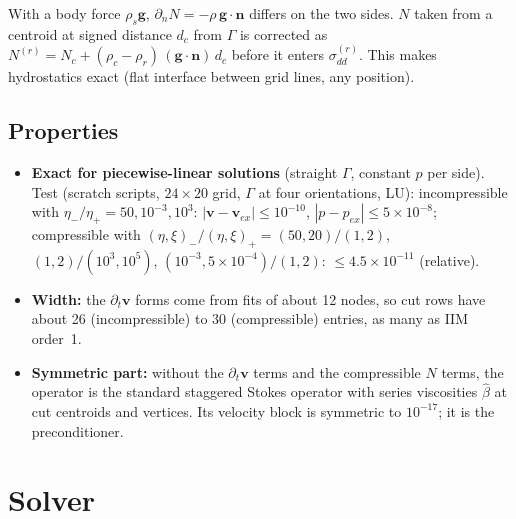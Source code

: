 \documentclass[11pt,a4paper]{article}
\begin{document}
With a body force $\rho_s\mathbf g$, $\partial_nN=-\rho\,\mathbf g\cdot\mathbf n$ differs on the two
sides. $N$ taken from a centroid at signed distance $d_c$ from $\Gamma$ is corrected as
$N^{(r)}=N_c+(\rho_c-\rho_r)\,(\mathbf g\cdot\mathbf n)\,d_c$ before it enters
$\sigma_{dd}^{(r)}$. This makes hydrostatics exact (flat interface between grid lines,
any position).

\subsection*{Properties}

\begin{itemize}
  \item \textbf{Exact for piecewise-linear solutions} (straight $\Gamma$, constant $p$ per side).
    Test (scratch scripts, $24\times20$ grid, $\Gamma$ at four orientations, LU):
    incompressible with $\eta_-/\eta_+=50,10^{-3},10^{3}$: $|\mathbf v-\mathbf v_{ex}|\le10^{-10}$,
    $|p-p_{ex}|\le5\times10^{-8}$; compressible with $(\eta,\xi)_-/(\eta,\xi)_+=(50,20)/(1,2)$,
    $(1,2)/(10^3,10^5)$, $(10^{-3},5\times10^{-4})/(1,2)$: $\le4.5\times10^{-11}$ (relative).
  \item \textbf{Width:} the $\partial_t\mathbf v$ forms come from fits of about 12 nodes, so cut rows
    have about 26 (incompressible) to 30 (compressible) entries, as many as IIM order~1.
  \item \textbf{Symmetric part:} without the $\partial_t\mathbf v$ terms and the compressible $N$ terms,
    the operator is the standard staggered Stokes operator with series viscosities
    $\hat\beta$ at cut centroids and vertices. Its velocity block is symmetric to
    $10^{-17}$; it is the preconditioner.
\end{itemize}

\section{Solver}\label{sec:solver}
\end{document}
